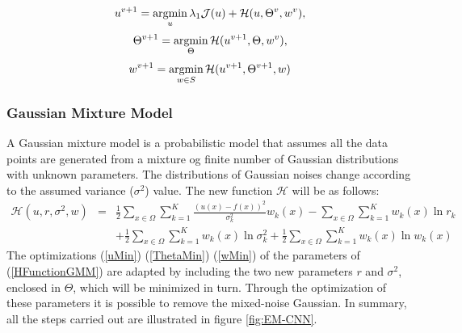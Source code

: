 \begin{equation}\label{uMin}
    u^{v+1} = \operatorname*{argmin}_u \lambda_1\mathcal{J}(u)+\mathcal{H}(u,\Theta^v,w^v),
\end{equation}
\begin{equation}\label{ThetaMin}
    \Theta^{v+1} = \operatorname*{argmin}_\Theta \mathcal{H}(u^{v+1}, \Theta, w^v),
\end{equation}
\begin{equation}\label{wMin}
    w^{v+1} = \operatorname*{argmin}_{w\in{S}} \mathcal{H}(u^{v+1}, \Theta^{v+1},w)
\end{equation}

\subsubsection{Gaussian Mixture Model}
A Gaussian mixture model is a probabilistic model that assumes all the data 
points are generated from a mixture og finite number of Gaussian distributions 
with unknown parameters. The distributions of Gaussian noises change 
according to the assumed variance ($\sigma^2$) value. The new function $ \mathcal{H} $ will be 
as follows:
\begin{eqnarray}\label{HFunctionGMM}
    \mathcal{H}(u,r,\sigma^2,w) & = & \frac{1}{2}\sum_{x\in\Omega}\sum_{k=1}^K\frac{(u(x)-f(x))^2}{\sigma^2_k}w_k(x)-\sum_{x\in\Omega}\sum_{k=1}^Kw_k(x)\ln{r_k}\nonumber \\
                                &   & + \frac{1}{2}\sum_{x\in\Omega}\sum_{k=1}^Kw_k(x)\ln{\sigma^2_k}+\frac{1}{2}\sum_{x\in\Omega}\sum_{k=1}^Kw_k(x)\ln{w_k}(x)
\end{eqnarray}
The optimizations (\ref{uMin}) (\ref{ThetaMin}) (\ref{wMin}) of the parameters of (\ref{HFunctionGMM}) are adapted by 
including the two new parameters $r$ and $\sigma^2$, enclosed in $\Theta$, which will be minimized 
in turn. Through the optimization of these parameters it is possible to remove 
the mixed-noise Gaussian. In summary, all the steps carried out are 
illustrated in figure \ref{fig:EM-CNN}.
